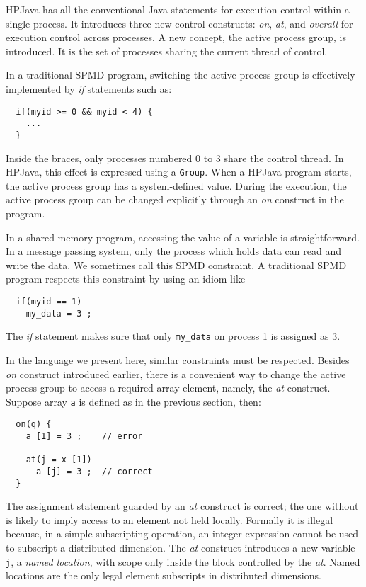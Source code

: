 HPJava has all the conventional Java statements for execution control
within a single process.  It introduces three new control
constructs: {\em on}, {\em at}, and {\em overall} for execution
control across processes.
A new concept, the active process group, is introduced. It is the
set of processes sharing the current thread of control.

In a traditional SPMD program, switching the active
process group is effectively implemented by {\em if} statements
such as:
\small
\begin{verbatim}
  if(myid >= 0 && myid < 4) {
    ...
  }
\end{verbatim}
\normalsize
Inside the braces, only processes numbered 0 to 3
share the control thread.
In HPJava, this effect is expressed using a \texttt{Group}.
When a HPJava program starts, the active process group has a
system-defined value.  During the execution, the active process group
can be changed explicitly through an {\em on} construct in the
program.

In a shared memory program, accessing the value of a variable is
straightforward. In a message passing system, only the process which
holds data can read and write the data.  We sometimes call this 
 SPMD constraint.  
A traditional SPMD program respects this constraint by using an idiom
like
\small
\begin{verbatim}
  if(myid == 1) 
    my_data = 3 ;
\end{verbatim}
\normalsize
The {\em if} statement makes sure that only \texttt{my\_data}
on process 1 is assigned as 3.

In the language we present here, similar constraints must be respected.
Besides \emph{on} construct introduced earlier, there is a
convenient way to change the active process group to access a required
array element, namely, the {\em at} construct.
Suppose array \texttt{a} is defined as in the previous section, then:
\small
\begin{verbatim}
  on(q) {
    a [1] = 3 ;    // error

    at(j = x [1])
      a [j] = 3 ;  // correct
  }
\end{verbatim}
\normalsize
The assignment statement guarded by an {\em at} construct is
correct; the one without is likely to imply access to an element
not held locally.  Formally it is illegal because, in a simple
subscripting operation, an integer expression cannot
be used to subscript a distributed dimension.  The
{\em at} construct introduces a new variable \texttt{j}, a {\em named
location}, with scope only inside the block controlled by the
{\em at}.  Named locations are the only legal element subscripts 
in distributed dimensions.

